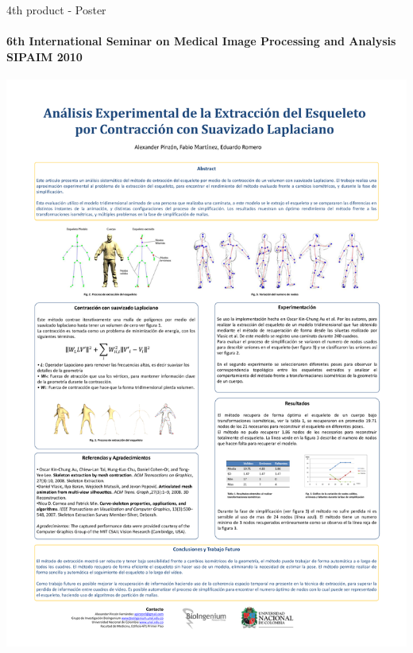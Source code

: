 \documentclass[10pt, compress, english]{beamer}
\begin{document}
\begin{frame}{4th product - Poster}


\framesubtitle{{\small{}6th International Seminar on Medical Image Processing and
Analysis SIPAIM 2010}}


\noindent \begin{center}
\includegraphics[height=0.8\textheight]{img/PosteraA0-150dpi}
\par\end{center}

\end{frame}
\end{document}
